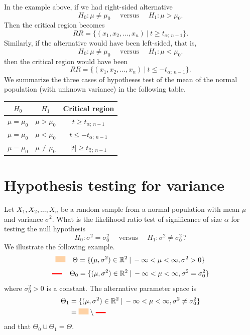 \begin{remark}
    In the example above, if we had right-sided alternative
    \[
        H_0 : \mu \neq \mu_0 \quad \text{ versus } \quad  H_1 : \mu > \mu_0. 
    \]
    Then the critical region becomes
    \[
        RR = \{ (x_1, x_2, \ldots, x_n) \> | \> t \geq t_{\alpha;\> n-1} \}.
    \]
    Similarly, if the alternative would have been left-sided, that is,
    \[
        H_0 : \mu \neq \mu_0 \quad \text{ versus } \quad  H_1 : \mu < \mu_0. 
    \]
    then the critical region would have been 
    \[
        RR = \{ (x_1, x_2, \ldots, x_n) \> | \> t \leq -t_{\alpha;\> n-1} \}.
    \]
    We summarize the three cases of hypotheses test of the mean of the normal population 
    (with unknown variance) in the following table.

    \begin{center}
        \begin{tabular}{|c|c|c|}
            \hline
            $H_0$ & $H_1$ & Critical region\\
            \hline
            $\mu = \mu_0$ & $\mu > \mu_0$ & $t \geq t_{\alpha;\> n-1}$\\
            \hline
            $\mu = \mu_0$ & $\mu < \mu_0$ & $t \leq -t_{\alpha;\> n-1}$\\
            \hline
            $\mu = \mu_0$ & $\mu \neq \mu_0$ & $|t| \geq t_{\frac{\alpha}{2};\> n-1}$\\
            \hline
        \end{tabular}
    \end{center}
\end{remark}

\section{Hypothesis testing for variance}

Let $X_1, X_2, \ldots, X_n$ be a random sample from a normal population with mean $\mu$ and variance $\sigma^2$.
What is the likelihood ratio test of significance of size $\alpha$ for testing the null hypothesis 
\[
    H_0 : \sigma^2 = \sigma^2_0 \quad \text{ versus } \quad H_1 : \sigma^2 \neq \sigma^2_0 \, ?
\]
We illustrate the following example. 
\[
    \recticon{orange} \quad \Theta = \{ (\mu, \sigma^2) \in \mathbb{R}^2 \> | \> -\infty < \mu < \infty, \sigma^2 > 0 \}
\]
\[
    \horl \quad \Theta_0 = \{ (\mu, \sigma^2) \in \mathbb{R}^2 \> | \> -\infty < \mu < \infty, \sigma^2 = \sigma^2_0 \}
\]
where $\sigma^2_0 > 0$ is a constant. The alternative parameter space is
\begin{align*}
    \Theta_1 &= \{ (\mu, \sigma^2) \in \mathbb{R}^2 \> | \> -\infty < \mu < \infty, \sigma^2 \neq \sigma^2_0 \}\\
    &= \recticon{orange} \setminus {\color{red} \horl}
\end{align*}
and that $\Theta_0 \cup \Theta_1 = \Theta$.


